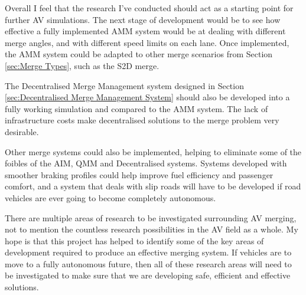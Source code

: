 Overall I feel that the research I've conducted should act as a starting point for further AV simulations. The next stage of development would be to see how effective a fully implemented AMM system would be at dealing with different merge angles, and with different speed limits on each lane. Once implemented, the AMM system could be adapted to other merge scenarios from Section \ref{sec:Merge Types}, such as the S2D merge.

The Decentralised Merge Management system designed in Section \ref{sec:Decentralised Merge Management System} should also be developed into a fully working simulation and compared to the AMM system. The lack of infrastructure costs make decentralised solutions to the merge problem very desirable.

Other merge systems could also be implemented, helping to eliminate some of the foibles of the AIM, QMM and Decentralised systems. Systems developed with smoother braking profiles could help improve fuel efficiency and passenger comfort, and a system that deals with slip roads will have to be developed if road vehicles are ever going to become completely autonomous.

There are multiple areas of research to be investigated surrounding AV merging, not to mention the countless research possibilities in the AV field as a whole. My hope is that this project has helped to identify some of the key areas of development required to produce an effective merging system. If vehicles are to move to a fully autonomous future, then all of these research areas will need to be investigated to make sure that we are developing safe, efficient and effective solutions.
